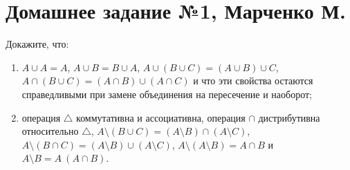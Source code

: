 


    \section*{Домашнее задание №1, Марченко М.}

    \begin{problem}[1]
        Докажите, что:
        \begin{enumerate}[label=(\alph{*})]
            \item \(A \cup A = A\), \(A \cup B = B \cup A\), \(A \cup (B \cup C) = (A \cup B) \cup C\), \(A \cap (B \cup C) = (A \cap B) \cup (A \cap C)\) и что эти свойства остаются справедливыми при замене объединения на пересечение и наоборот;
            \item операция \(\triangle\) коммутативна и ассоциативна, операция \(\cap\) дистрибутивна относительно \(\triangle\), \(A \setminus (B \cup C) = (A \setminus B) \cap (A \setminus C)\), \(A \setminus (B \cap C) = (A \setminus B) \cup (A \setminus C)\), \(A \setminus (A \setminus B) = A \cap B\) и \(A \setminus B = A \ (A \cap B)\).
        \end{enumerate}
    \end{problem}
